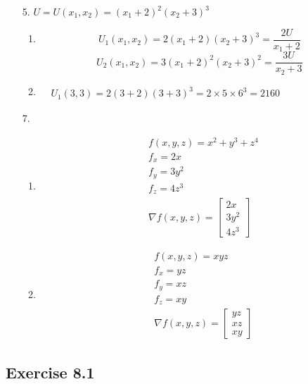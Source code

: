 \documentclass{./../../Latex/homework}
\begin{document}
\begin{enumerate}
\item[5.] $U=U\left(x_{1}, x_{2}\right)=\left(x_{1}+2\right)^{2}\left(x_{2}+3\right)^{3}$ \\
\begin{enumerate}
\item $$ U_{1}\left(x_{1}, x_{2}\right)=2\left(x_{1}+2\right)\left(x_{2}+3\right)^{3}=\frac{2 U}{x_{1}+2}$$
$$
U_{2}\left(x_{1}, x_{2}\right)=3\left(x_{1}+2\right)^{2}\left(x_{2}+3\right)^{2}=\frac{3 U}{x_{2}+3}
$$

\item $
\begin{aligned}
& U_{1}(3,3)=2(3+2)(3+3)^{3} = 2 \times 5 \times 6^{3}=2160
\end{aligned}
$ \\
\end{enumerate}

\item[7.] \begin{enumerate}
\item
$$
\begin{aligned}
&f(x, y, z)=x^{2}+y^{3}+z^{4} \\
&f_{x}=2 x \\
&f_{y}=3 y^{2} \\
&f_{z}=4 z^{3} \\
&\nabla f(x, y, z)=\left[\begin{array}{l}
2 x \\
3 y^{2} \\
4 z^{3}
\end{array}\right]
\end{aligned}
$$
\item
$$
\begin{aligned}
&f(x, y, z)=x y z \\
&f_{x}=y z \\
&f_{y}=xz \\
&f_{z}=x y \\
&\nabla f(x, y, z)=\left[\begin{array}{l}
yz \\
x z \\
x y
\end{array}\right]
\end{aligned}
$$
\end{enumerate}
\end{enumerate}

\subsection*{Exercise 8.1} 
\end{document}
